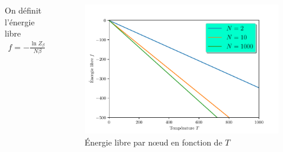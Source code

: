 \documentclass[french]{beamer}
\begin{document}
\begin{frame}
\begin{columns}[c]
On définit l'énergie libre
\begin{align*}
f = - \frac{\ln Z_\beta}{N \beta}
\end{align*}
\vspace*{-1.5cm}
\begin{figure}
\centering
\includegraphics[height=0.65\textheight]{assets/Elibre}
\caption{\'Energie libre par n\oe{}ud en fonction de $T$}
\label{fig:elibre}
\end{figure}
\end{columns}
\end{frame}


\end{document}
